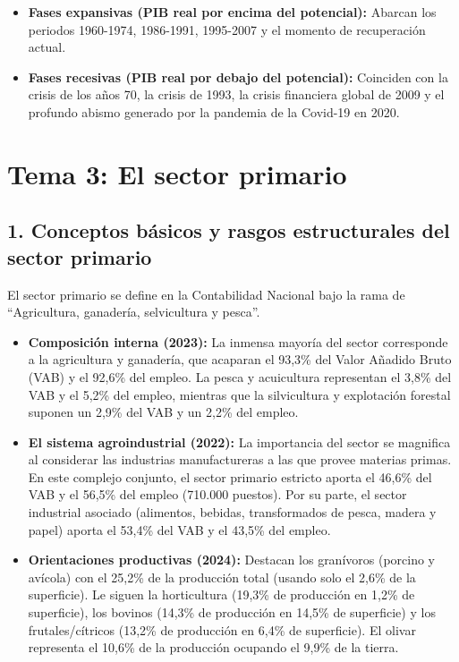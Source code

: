 \begin{itemize}
  \item \textbf{Fases expansivas (PIB real por encima del potencial):} Abarcan los periodos 1960-1974, 1986-1991, 1995-2007 y el momento de recuperación actual.
  \item \textbf{Fases recesivas (PIB real por debajo del potencial):} Coinciden con la crisis de los años 70, la crisis de 1993, la crisis financiera global de 2009 y el profundo abismo generado por la pandemia de la Covid-19 en 2020.
\end{itemize}
 
\clearpage
\section*{Tema 3: El sector primario}

\subsection*{1. Conceptos básicos y rasgos estructurales del sector primario}

El sector primario se define en la Contabilidad Nacional bajo la rama de ``Agricultura, ganadería, selvicultura y pesca''.

\begin{itemize}
  \item \textbf{Composición interna (2023):} La inmensa mayoría del sector corresponde a la agricultura y ganadería, que acaparan el 93,3\% del Valor Añadido Bruto (VAB) y el 92,6\% del empleo. La pesca y acuicultura representan el 3,8\% del VAB y el 5,2\% del empleo, mientras que la silvicultura y explotación forestal suponen un 2,9\% del VAB y un 2,2\% del empleo.
  \item \textbf{El sistema agroindustrial (2022):} La importancia del sector se magnifica al considerar las industrias manufactureras a las que provee materias primas. En este complejo conjunto, el sector primario estricto aporta el 46,6\% del VAB y el 56,5\% del empleo (710.000 puestos). Por su parte, el sector industrial asociado (alimentos, bebidas, transformados de pesca, madera y papel) aporta el 53,4\% del VAB y el 43,5\% del empleo.
  \item \textbf{Orientaciones productivas (2024):} Destacan los granívoros (porcino y avícola) con el 25,2\% de la producción total (usando solo el 2,6\% de la superficie). Le siguen la horticultura (19,3\% de producción en 1,2\% de superficie), los bovinos (14,3\% de producción en 14,5\% de superficie) y los frutales/cítricos (13,2\% de producción en 6,4\% de superficie). El olivar representa el 10,6\% de la producción ocupando el 9,9\% de la tierra.
\end{itemize}

